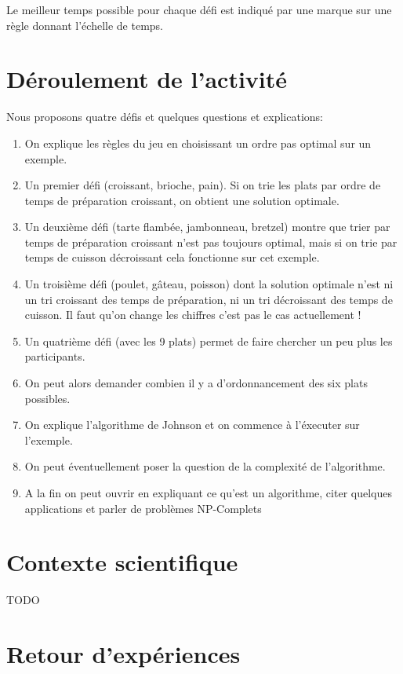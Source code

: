 \documentclass[a4paper]{article}
\begin{document}
Le meilleur temps possible pour chaque défi est indiqué par une marque sur une règle donnant l'échelle de temps.


\section{Déroulement de l'activité}

Nous proposons quatre défis et quelques questions et explications:
\begin{enumerate}
\item On explique les règles du jeu en choisissant un ordre pas optimal sur un exemple.
\item Un premier défi (croissant, brioche, pain). Si on trie les plats par ordre de temps de préparation croissant, on obtient une solution optimale.
\item Un deuxième défi (tarte flambée, jambonneau, bretzel) montre que trier par temps de préparation croissant n'est pas toujours optimal, mais si on trie par temps de cuisson décroissant cela fonctionne sur cet exemple.
\item Un troisième défi (poulet, gâteau, poisson) dont la solution optimale n'est ni un tri croissant des temps de préparation, ni un tri décroissant des temps de cuisson.
{\huge Il faut qu'on change les chiffres c'est pas le cas actuellement !}
\item Un quatrième défi (avec les 9 plats) permet de faire chercher un peu plus les participants.
\item On peut alors demander combien il y a d'ordonnancement des six plats possibles.
\item On explique l'algorithme de Johnson et on commence à l'éxecuter sur l'exemple.
\item On peut éventuellement poser la question de la complexité de l'algorithme.
\item A la fin on peut ouvrir en expliquant ce qu'est un algorithme, citer quelques applications et parler de problèmes NP-Complets 
\end{enumerate}

\section{Contexte scientifique}

TODO

\section{Retour d'expériences}
\end{document}
